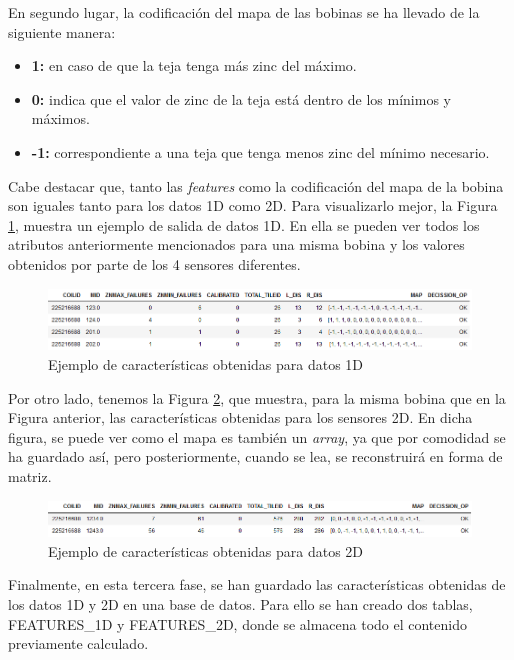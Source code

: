 En segundo lugar, la codificación del mapa de las bobinas se ha llevado de la siguiente manera:
\begin{itemize}
    \item \textbf{1:} en caso de que la teja tenga más zinc del máximo.
    \item \textbf{0:} indica que el valor de zinc de la teja está dentro de los mínimos y máximos.
    \item \textbf{-1:} correspondiente a una teja que tenga menos zinc del mínimo necesario.
\end{itemize}

Cabe destacar que, tanto las \emph{features} como la codificación del mapa de la bobina son iguales tanto para los datos 1D como 2D. Para visualizarlo mejor, la Figura \ref{f:fea1d}, muestra un ejemplo de salida de datos 1D. En ella se pueden ver todos los atributos anteriormente mencionados para una misma bobina y los valores obtenidos por parte de los 4 sensores diferentes.

\begin{figure}[h]
 \centering
  \includegraphics[width=1\textwidth]{img/fea1D.PNG}
 \caption{Ejemplo de características obtenidas para datos 1D}
 \label{f:fea1d}
\end{figure}

Por otro lado, tenemos la Figura \ref{f:fea2d}, que muestra, para la misma bobina que en la Figura anterior, las características obtenidas para los sensores 2D. En dicha figura, se puede ver como el mapa es también un \emph{array}, ya que por comodidad se ha guardado así, pero posteriormente, cuando se lea, se reconstruirá en forma de matriz.

\begin{figure}[h]
 \centering
  \includegraphics[width=1\textwidth]{img/fea2D.PNG}
 \caption{Ejemplo de características obtenidas para datos 2D}
 \label{f:fea2d}
\end{figure}

Finalmente, en esta tercera fase, se han guardado las características obtenidas de los datos 1D y 2D en una base de datos. Para ello se han creado dos tablas, FEATURES\_1D y FEATURES\_2D, donde se almacena todo el contenido previamente calculado.

